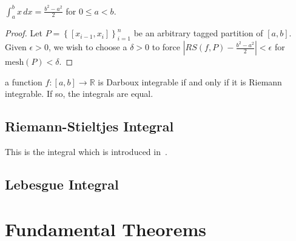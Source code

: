 \begin{prop}
$ \int_a^b x\, dx = \frac{b^2-a^2}{2}$ for $0\leq a < b$.
\end{prop}
\begin{proof}
Let $P = \left\{ \left[x_{i-1},x_i\right] \right\}_{i=1}^n$ be an arbitrary tagged partition of $\left[a,b\right]$. Given $\epsilon>0$, we wish to choose a $\delta>0$ to force $\left|RS\left(f,P\right) - \frac{b^2-a^2}{2}\right|<\epsilon$ for $\text{mesh}\left(P\right)<\delta$.
\end{proof}













\begin{theorem}
a function $f:\left[a,b\right]\rightarrow \mathbb{R}$ is Darboux integrable if and only if it is Riemann integrable. If so, the integrals are equal.
\end{theorem}














\section{Riemann-Stieltjes Integral}
This is the integral which is introduced in~\cite{rudin1964principles}.


\section{Lebesgue Integral}























\chapter{Fundamental Theorems}

